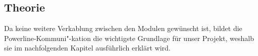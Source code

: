 %
\subsection{Theorie}
Da keine weitere Verkablung zwischen den Modulen gewünscht ist, bildet die Powerline-Kommuni"-kation die wichtigste Grundlage für unser Projekt, weshalb sie im nachfolgenden Kapitel ausführlich erklärt wird. 
